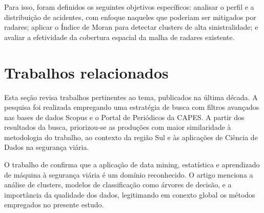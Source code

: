 \documentclass[12pt]{article}
\begin{document}
Para isso, foram definidos os seguintes objetivos específicos: analisar o perfil e a distribuição de acidentes, com enfoque naqueles que poderiam ser mitigados por radares; aplicar o Índice de Moran para detectar clusters de alta sinistralidade; e avaliar a efetividade da cobertura espacial da malha de radares existente.


\section{Trabalhos relacionados}

Esta seção revisa trabalhos pertinentes ao tema, publicados na última década. A pesquisa foi realizada empregando uma estratégia de busca com filtros avançados nas bases de dados Scopus e o Portal de Periódicos da CAPES. 
A partir dos resultados da busca, priorizou-se as produções com maior similaridade à metodologia do trabalho, ao contexto da região Sul e às aplicações de Ciência de Dados na segurança viária.

O trabalho de \cite{deona2021} confirma que a aplicação de data mining, estatística e aprendizado de máquina à segurança viária é um domínio reconhecido. 
O artigo menciona a análise de clusters, modelos de classificação como árvores de decisão, e a importância da qualidade dos dados, legitimando em conexto global os métodos empregados no presente estudo.
\end{document}
